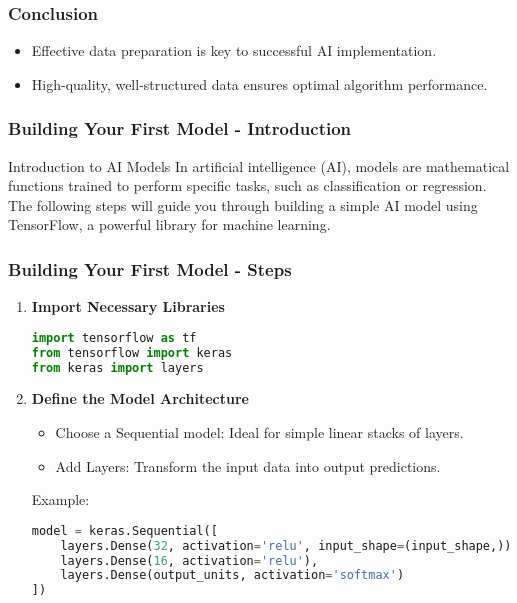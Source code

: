 \documentclass[aspectratio=169]{beamer}
\begin{document}
\begin{frame}[fragile]
    \frametitle{Conclusion}
    \begin{itemize}
        \item Effective data preparation is key to successful AI implementation.
        \item High-quality, well-structured data ensures optimal algorithm performance.
    \end{itemize}
\end{frame}

\begin{frame}[fragile]
    \frametitle{Building Your First Model - Introduction}
    \begin{block}{Introduction to AI Models}
        In artificial intelligence (AI), models are mathematical functions trained to perform specific tasks, such as classification or regression. 
        The following steps will guide you through building a simple AI model using TensorFlow, a powerful library for machine learning.
    \end{block}
\end{frame}

\begin{frame}[fragile]
    \frametitle{Building Your First Model - Steps}
    \begin{enumerate}
        \item \textbf{Import Necessary Libraries}
        \begin{lstlisting}[language=Python]
import tensorflow as tf
from tensorflow import keras
from keras import layers
        \end{lstlisting}

        \item \textbf{Define the Model Architecture}
        \begin{itemize}
            \item Choose a Sequential model: Ideal for simple linear stacks of layers.
            \item Add Layers: Transform the input data into output predictions.
        \end{itemize}
        Example:
        \begin{lstlisting}[language=Python]
model = keras.Sequential([
    layers.Dense(32, activation='relu', input_shape=(input_shape,)),  # Input Layer
    layers.Dense(16, activation='relu'),                               # Hidden Layer
    layers.Dense(output_units, activation='softmax')                  # Output Layer
])
        \end{lstlisting}
    \end{enumerate}
\end{frame}
\end{document}
